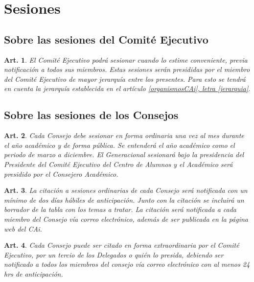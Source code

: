 \documentclass[letterpaper,11pt]{article}
\theoremstyle{plain}
\newtheorem{art}{Art.} %
\newcommand{\aaref}[2]{\hyperref[#2]{\ref*{#1}, letra \ref*{#2}}}
\begin{document}
	\section{Sesiones}\label{sesiones}

		\subsection*{Sobre las sesiones del Comité Ejecutivo}

			\begin{art} \label{sesionesEjecutivo}
				El Comité Ejecutivo podrá sesionar cuando lo estime conveniente, previa notificación a todos sus miembros. Estas sesiones serán presididas por el miembro del Comité Ejecutivo de mayor jerarquía entre los presentes. Para esto se tendrá en cuenta la jerarquía establecida en el artículo  \aaref{organismosCAi}{jerarquia}.
			\end{art}

		\subsection*{Sobre las sesiones de los Consejos}

			\begin{art}\label{consejos}
				Cada Consejo debe sesionar en forma ordinaria una vez al mes durante el año académico y de forma pública. Se entenderá el año académico como el periodo de marzo a diciembre. El Generacional sesionará bajo la presidencia del Presidente del Comité Ejecutivo del Centro de Alumnos y el Académico será presidido por el Consejero Académico.
			\end{art}

			\begin{art}\label{consejoOrdinario}
				La citación a sesiones ordinarias de cada Consejo será notificada con un mínimo de dos días hábiles de anticipación. Junto con la citación se incluirá un borrador de la tabla con los temas a tratar. La citación será notificada a cada miembro del Consejo vía correo electrónico, además de ser publicada en la página web del CAi.
			\end{art}

			\begin{art}\label{consejoExtraordinario}
				Cada Consejo puede ser citado en forma extraordinaria por el Comité Ejecutivo, por un tercio de los Delegados o quién lo presida, debiendo ser notificado a todos los miembros del consejo vía correo electrónico con al menos 24 hrs de anticipación.
			\end{art}
\end{document}
